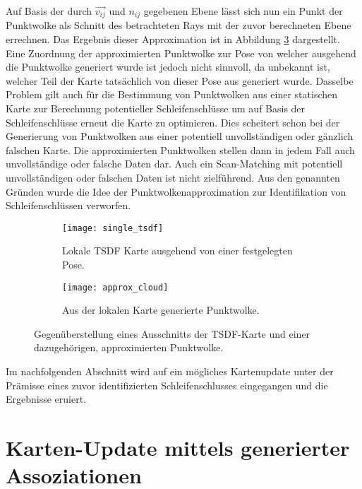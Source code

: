 Auf Basis der durch $\vec{v_{ij}}$ und $n_{ij}$ gegebenen Ebene lässt sich nun ein Punkt der Punktwolke als Schnitt des betrachteten Rays mit der zuvor berechneten Ebene errechnen. Das Ergebnis dieser Approximation ist in Abbildung \ref{fig:pointcloud_approximation} dargestellt. Eine Zuordnung der approximierten Punktwolke zur Pose von welcher ausgehend die Punktwolke generiert wurde ist jedoch nicht sinnvoll, da unbekannt ist, welcher Teil der Karte tatsächlich von dieser Pose aus generiert wurde. Dasselbe Problem gilt auch für die Bestimmung von Punktwolken aus einer statischen Karte zur Berechnung potentieller Schleifenschlüsse um auf Basis der Schleifenschlüsse erneut die Karte zu optimieren. Dies scheitert schon bei der Generierung von Punktwolken aus einer potentiell unvollständigen oder gänzlich falschen Karte. Die approximierten Punktwolken stellen dann in jedem Fall auch unvollständige oder falsche Daten dar. Auch ein Scan-Matching mit potentiell unvollständigen oder falschen Daten ist nicht zielführend. Aus den genannten Gründen wurde die Idee der Punktwolkenapproximation zur Identifikation von Schleifenschlüssen verworfen.

\begin{figure}
	\centering
	\begin{subfigure}{.5\textwidth}
 		 \centering
  		 \texttt{[image: single\_tsdf]}
  		 \centering \caption{Lokale TSDF Karte ausgehend von einer festgelegten Pose.}
  		 \label{fig:single_tsdf}
	\end{subfigure}%
	\begin{subfigure}{.5\textwidth}
    	\centering
  		\texttt{[image: approx\_cloud]}
  		\centering \caption{Aus der lokalen Karte generierte Punktwolke.}
  		\label{fig:approx_cloud}
	\end{subfigure}
	\caption{Gegenüberstellung eines Ausschnitts der TSDF-Karte und einer dazugehörigen, approximierten Punktwolke.}
	\label{fig:pointcloud_approximation}
\end{figure}

Im nachfolgenden Abschnitt wird auf ein mögliches Kartenupdate unter der Prämisse eines zuvor identifizierten Schleifenschlusses eingegangen und die Ergebnisse eruiert.

\section{Karten-Update mittels generierter Assoziationen}


